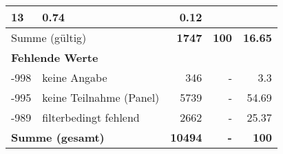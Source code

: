 \begin{longtable}{lXrrr}
       \num{13} &
       \num[round-mode=places,round-precision=2]{0.74} &
         \num[round-mode=places,round-precision=2]{0.12} \\
     \midrule
     \multicolumn{2}{l}{Summe (gültig)} &
       \textbf{\num{1747}} &
     \textbf{\num{100}} &
       \textbf{\num[round-mode=places,round-precision=2]{16.65}} \\
     \multicolumn{5}{l}{\textbf{Fehlende Werte}}\\
       -998 &
       keine Angabe &
         \num{346} &
        - &
         \num[round-mode=places,round-precision=2]{3.3} \\
       -995 &
       keine Teilnahme (Panel) &
         \num{5739} &
        - &
         \num[round-mode=places,round-precision=2]{54.69} \\
       -989 &
       filterbedingt fehlend &
         \num{2662} &
        - &
         \num[round-mode=places,round-precision=2]{25.37} \\
     \midrule
     \multicolumn{2}{l}{\textbf{Summe (gesamt)}} &
          \textbf{\num{10494}} &
        \textbf{-} &
        \textbf{\num{100}} \\
     \bottomrule
     \end{longtable}
     
